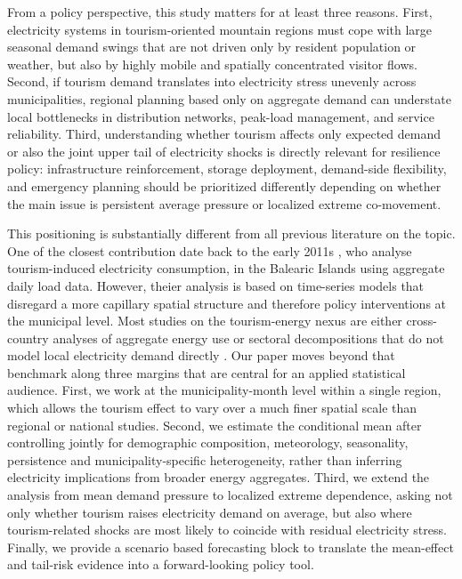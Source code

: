 \documentclass[11pt,a4paper]{article}
\begin{document}
\noindent
\hangindent=-5mm
From a policy perspective, this study matters for at least three reasons.
First, electricity systems in tourism-oriented mountain regions must 
cope with large seasonal demand swings that are not driven 
only by resident population or weather, 
but also by highly mobile and spatially 
concentrated visitor flows. Second, if tourism demand translates into electricity stress unevenly across
municipalities, regional planning based only on aggregate demand 
can understate local bottlenecks in distribution networks, 
peak-load management, and service reliability. 
Third, understanding whether tourism affects only expected
demand or also the joint upper tail of electricity shocks
is directly relevant for resilience policy: 
infrastructure reinforcement, storage deployment, 
demand-side flexibility, and emergency planning should 
be prioritized differently depending on whether 
the main issue is persistent average pressure 
or localized extreme co-movement.


\noindent
\hangindent=-5mm
This positioning is substantially different from  all previous literature
on the topic. One of the closest contribution date back to the early 2011s \citet{bakhat2011}, 
 who analyse tourism-induced electricity consumption,
in the Balearic Islands using aggregate daily load data. However, theier analysis is based on time-series models
that disregard a more capillary spatial structure and therefore policy interventions at the municipal level.
Most studies on the tourism-energy nexus are either cross-country analyses of aggregate
energy use or sectoral decompositions that do not model local electricity demand directly \citep{badal2023,soylu2024,bianco2020}. 
Our paper moves beyond that benchmark along three margins that are central for an applied statistical audience.
First, we work at the municipality-month level within a single region, 
which allows the tourism effect to vary over a much finer spatial scale than regional or national studies. 
Second, we estimate the conditional mean after controlling jointly for demographic composition, 
meteorology, seasonality, persistence and municipality-specific heterogeneity, 
rather than inferring electricity implications from broader energy aggregates. 
Third, we extend the analysis from mean demand pressure to localized extreme dependence, 
asking not only whether tourism raises electricity demand on average, 
but also where tourism-related shocks are most likely to coincide 
with residual electricity stress. Finally, we provide a scenario 
based forecasting  block to translate the mean-effect 
and tail-risk evidence 
into a forward-looking policy tool.
\end{document}
